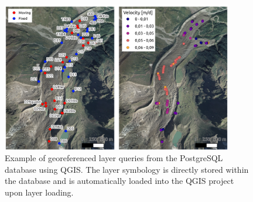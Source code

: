 \begin{figure}[ht]
  \centering
  \includegraphics[width=0.9\textwidth]{db_qgis_query.png}
    \caption{Example of georeferenced layer queries from the PostgreSQL database using QGIS. The layer symbology is directly stored within the database and is automatically loaded into the QGIS project upon layer loading.}  \label{fig:3:db_qgis_query}
\end{figure}

\makechapterbibliography{}

